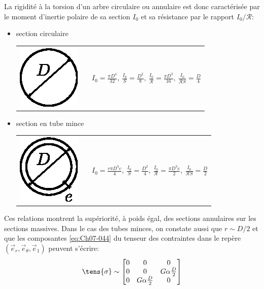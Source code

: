 La rigidité à la torsion d'un arbre circulaire ou annulaire est donc caractérisée par le moment d'inertie polaire de sa section $I_0$ et sa résistance par le rapport $I_0/\mathcal{R}$:
\begin{itemize}
    \item section circulaire\\[5pt]
        \begin{tabular}{m{2cm}p{1cm}m{8cm}}
            \includegraphics{../images/T1_Ch07-12}&&
            $\displaystyle I_0 = \frac{\pi D^4}{32},\ \frac{I_0}{S} = \frac{D^2}{8},\ \frac{I_0}{\mathcal{R}} = \frac{\pi D^3}{16},\ \frac{I_0}{\mathcal{R} S} = \frac{D}{4}$
        \end{tabular}
\item section en tube mince\\[5pt]
    \begin{tabular}{m{2cm}p{1cm}m{8cm}}
        \includegraphics{../images/T1_Ch07-13}&&
        $\displaystyle     I_0 = \frac{r\pi D^3 e}{4},\ \frac{I_0}{S} = \frac{D^2}{4},\ \frac{I_0}{\mathcal{R}} = \frac{\pi D^3 e}{2},\ \frac{I_0}{\mathcal{R} S} = \frac{D}{2}$
    \end{tabular}
\end{itemize}
Ces relations montrent la supériorité, à poids égal, des sections annulaires sur les sections massives.
Dans le cas des tubes minces, on constate aussi que $r \sim D/2$ et que les composantes \eqref{eq:Ch07-044} du tenseur des contraintes dans le repère $\left( \vec{e}_r, \vec{e}_{\theta}, \vec{e}_1 \right)$ peuvent s'écrire:
\begin{equation}
    \tens{\sigma} \sim
    \begin{bmatrix}
        0 & 0 & 0 \\
        0 & 0 & G \alpha \frac{D}{2} \\
        0 & G\alpha \frac{D}{2} & 0
    \end{bmatrix}
\end{equation}
